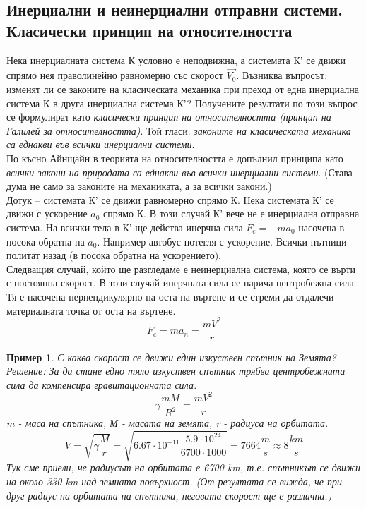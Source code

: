 \documentclass[fleqn]{article}
\newtheorem{example}{Пример}[subsection]
\begin{document}
\subsection{Инерциални и неинерциални отправни системи. Класически принцип на относителността}
Нека инерциалната система К условно е неподвижна, а системата К' се движи спрямо нея праволинейно равномерно със скорост $\vec{V_0}$. Възниква въпросът: изменят ли се законите на класическата механика при преход от една инерциална система К в друга инерциална система К'? Получените резултати по този въпрос се формулират като \textit{класически принцип на относителността (принцип на Галилей за относителността)}. Той гласи: \textit{законите на класическата механика са еднакви във всички инерциални системи}. \\
По късно Айнщайн в теорията на относителността е допълнил принципа като \textit{всички закони на природата са еднакви във всички инерциални системи}. (Става дума не само за законите на механиката, а за всички закони.)\\
Дотук – системата К' се движи равномерно спрямо К. Нека системата К' се движи с ускорение $a_0$ спрямо К. В този случай К' вече не е инерциална отправна система. На всички тела в К' ще действа инерчна сила $F_e = -m a_0 $ насочена в посока обратна на $a_0$. Например автобус потегля с ускорение. Всички пътници политат назад (в посока обратна на ускорението). \\
Следващия случай, който ще разгледаме е неинерциална система, която се върти с постоянна скорост. В този случай инерчната сила се нарича центробежна сила. Тя е насочена перпендикулярно на оста на въртене и се стреми да отдалечи материалната точка от оста на въртене.
$$F_c = m a_n = \dfrac{mV^2}{r}$$

\begin{example}
С каква скорост се движи един изкуствен спътник на Земята?\\
Решение:  За да стане едно тяло изкуствен спътник трябва центробежната сила да компенсира
гравитационната сила.
$$\gamma \dfrac{mM}{R^2} = \dfrac{mV^2}{r}$$
m - маса на спътника, М - масата на земята, r - радиуса на орбитата. 
$$V = \sqrt{\gamma \dfrac{M}{r}} = \sqrt{6.67 \cdot 10^{-11} \dfrac{5.9 \cdot 10^{24}}{6700 \cdot 1000}} = 7664 \dfrac{m}{s} \approx 8 \dfrac{km}{s}$$
Тук сме приели, че радиусът на орбитата е 6700 km, т.е. спътникът се движи на около 330 km над земната повърхност. (От резултата се вижда, че при друг радиус на орбитата на спътника, неговата скорост ще е различна.)
\end{example}
\end{document}
